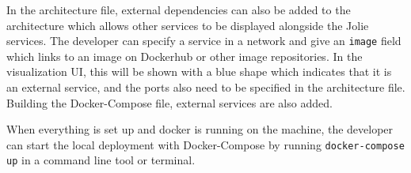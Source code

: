 In the architecture file, external dependencies can also be added to the architecture which allows other services to be displayed alongside the Jolie services. The developer can specify a service in a network and give an \texttt{image} field
which links to an image on Dockerhub or other image repositories. In the visualization UI, this will be shown with a blue shape which indicates that it is an external service, and the ports also need to be specified in the architecture file.
Building the Docker-Compose file, external services are also added.

When everything is set up and docker is running on the machine, the developer can start the local deployment with Docker-Compose by running \texttt{docker-compose up} in a command line tool or terminal.
